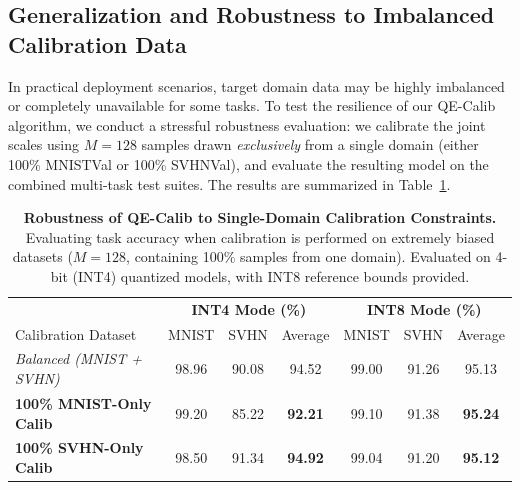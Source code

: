 \subsection{Generalization and Robustness to Imbalanced Calibration Data}
In practical deployment scenarios, target domain data may be highly imbalanced or completely unavailable for some tasks. To test the resilience of our QE-Calib algorithm, we conduct a stressful robustness evaluation: we calibrate the joint scales using $M = 128$ samples drawn \emph{exclusively} from a single domain (either 100\% MNISTVal or 100\% SVHNVal), and evaluate the resulting model on the combined multi-task test suites. The results are summarized in Table~\ref{tab:imbalanced_results}.

\begin{table}[t]
\caption{\textbf{Robustness of QE-Calib to Single-Domain Calibration Constraints.} Evaluating task accuracy when calibration is performed on extremely biased datasets ($M=128$, containing 100\% samples from one domain). Evaluated on 4-bit (INT4) quantized models, with INT8 reference bounds provided.}
\label{tab:imbalanced_results}
\vskip 0.15in
\begin{center}
\begin{small}
\begin{sc}
\begin{tabular}{lcccccc}
\toprule
 & \multicolumn{3}{c}{\textbf{INT4 Mode (\%)}} & \multicolumn{3}{c}{\textbf{INT8 Mode (\%)}} \\
Calibration Dataset & MNIST & SVHN & Average & MNIST & SVHN & Average \\
\midrule
\textit{Balanced (MNIST + SVHN)} & 98.96 & 90.08 & 94.52 & 99.00 & 91.26 & 95.13 \\
\midrule
\textbf{100\% MNIST-Only Calib} & 99.20 & 85.22 & \textbf{92.21} & 99.10 & 91.38 & \textbf{95.24} \\
\textbf{100\% SVHN-Only Calib}  & 98.50 & 91.34 & \textbf{94.92} & 99.04 & 91.20 & \textbf{95.12} \\
\bottomrule
\end{tabular}
\end{sc}
\end{small}
\end{center}
\vskip -0.1in
\end{table}

